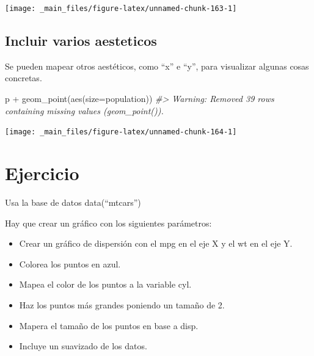 \documentclass[
]{book}
\newenvironment{Shaded}{\begin{snugshade}}{\end{snugshade}}
\newcommand{\AttributeTok}[1]{\textcolor[rgb]{0.77,0.63,0.00}{#1}}
\newcommand{\CommentTok}[1]{\textcolor[rgb]{0.56,0.35,0.01}{\textit{#1}}}
\newcommand{\FunctionTok}[1]{\textcolor[rgb]{0.00,0.00,0.00}{#1}}
\newcommand{\NormalTok}[1]{#1}
\newcommand{\SpecialCharTok}[1]{\textcolor[rgb]{0.00,0.00,0.00}{#1}}
\providecommand{\tightlist}{%
  \setlength{\itemsep}{0pt}\setlength{\parskip}{0pt}}
\begin{document}
\begin{center}\texttt{[image: \_main\_files/figure-latex/unnamed-chunk-163-1]} \end{center}

\hypertarget{incluir-varios-aesteticos}{%
\subsection{Incluir varios aesteticos}\label{incluir-varios-aesteticos}}

Se pueden mapear otros aestéticos, como ``x'' e ``y'', para visualizar algunas cosas concretas.

\begin{Shaded}
\begin{Highlighting}[]
\NormalTok{p }\SpecialCharTok{+}
  \FunctionTok{geom\_point}\NormalTok{(}\FunctionTok{aes}\NormalTok{(}\AttributeTok{size=}\NormalTok{population))}
\CommentTok{\#\textgreater{} Warning: Removed 39 rows containing missing values (\textasciigrave{}geom\_point()\textasciigrave{}).}
\end{Highlighting}
\end{Shaded}

\begin{center}\texttt{[image: \_main\_files/figure-latex/unnamed-chunk-164-1]} \end{center}

\hypertarget{ejercicio-1}{%
\section{Ejercicio}\label{ejercicio-1}}

Usa la base de datos data(``mtcars'')

Hay que crear un gráfico con los siguientes parámetros:

\begin{itemize}
\tightlist
\item
  Crear un gráfico de dispersión con el mpg en el eje X y el wt en el eje Y.
\item
  Colorea los puntos en azul.
\item
  Mapea el color de los puntos a la variable cyl.
\item
  Haz los puntos más grandes poniendo un tamaño de 2.
\item
  Mapera el tamaño de los puntos en base a disp.
\item
  Incluye un suavizado de los datos.
\end{itemize}
\end{document}
